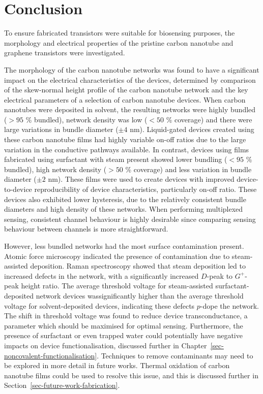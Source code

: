 \documentclass[
  a4paper,
]{scrbook}
\begin{document}
\hypertarget{conclusion}{%
\section{Conclusion}\label{conclusion}}

To ensure fabricated transistors were suitable for biosensing purposes,
the morphology and electrical properties of the pristine carbon nanotube
and graphene transistors were investigated.

The morphology of the carbon nanotube networks was found to have a
significant impact on the electrical characteristics of the devices,
determined by comparison of the skew-normal height profile of the carbon
nanotube network and the key electrical parameters of a selection of
carbon nanotube devices. When carbon nanotubes were deposited in
solvent, the resulting networks were highly bundled (\(>95\) \%
bundled), network density was low (\(<50\) \% coverage) and there were
large variations in bundle diameter (\(\pm 4\) nm). Liquid-gated devices
created using these carbon nanotube films had highly variable on-off
ratios due to the large variation in the conductive pathways available.
In contrast, devices using films fabricated using surfactant with steam
present showed lower bundling (\(<95\) \% bundled), high network density
(\(>50\) \% coverage) and less variation in bundle diameter (\(\pm 2\)
nm). These films were used to create devices with improved
device-to-device reproducibility of device characteristics, particularly
on-off ratio. These devices also exhibited lower hysteresis, due to the
relatively consistent bundle diameters and high density of these
networks. When performing multiplexed sensing, consistent channel
behaviour is highly desirable since comparing sensing behaviour between
channels is more straightforward.

However, less bundled networks had the most surface contamination
present. Atomic force microscopy indicated the presence of contamination
due to steam-assisted deposition. Raman spectroscopy showed that steam
deposition led to increased defects in the network, with a significantly
increased \(D\)-peak to \(G^+\)-peak height ratio. The average threshold
voltage for steam-assisted surfactant-deposited network devices
wassignificantly higher than the average threshold voltage for
solvent-deposited devices, indicating these defects \(p\)-dope the
network. The shift in threshold voltage was found to reduce device
transconductance, a parameter which should be maximised for optimal
sensing. Furthermore, the presence of surfactant or even trapped water
could potentially have negative impacts on device functionalisation,
discussed further in Chapter~\ref{sec-noncovalent-functionalisation}.
Techniques to remove contaminants may need to be explored in more detail
in future works. Thermal oxidation of carbon nanotube films could be
used to resolve this issue, and this is discussed further in
Section~\ref{sec-future-work-fabrication}.
\end{document}
